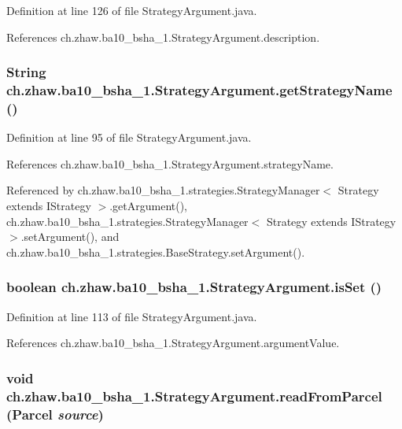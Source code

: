 Definition at line 126 of file StrategyArgument.java.

References ch.zhaw.ba10\_\-bsha\_\-1.StrategyArgument.description.\hypertarget{classch_1_1zhaw_1_1ba10__bsha__1_1_1StrategyArgument_a20a6d523b6d1e1ba34f3d2de700aa6d2}{
\subsubsection[{getStrategyName}]{\setlength{\rightskip}{0pt plus 5cm}String ch.zhaw.ba10\_\-bsha\_\-1.StrategyArgument.getStrategyName ()}}
\label{classch_1_1zhaw_1_1ba10__bsha__1_1_1StrategyArgument_a20a6d523b6d1e1ba34f3d2de700aa6d2}


Definition at line 95 of file StrategyArgument.java.

References ch.zhaw.ba10\_\-bsha\_\-1.StrategyArgument.strategyName.

Referenced by ch.zhaw.ba10\_\-bsha\_\-1.strategies.StrategyManager$<$ Strategy extends IStrategy $>$.getArgument(), ch.zhaw.ba10\_\-bsha\_\-1.strategies.StrategyManager$<$ Strategy extends IStrategy $>$.setArgument(), and ch.zhaw.ba10\_\-bsha\_\-1.strategies.BaseStrategy.setArgument().\hypertarget{classch_1_1zhaw_1_1ba10__bsha__1_1_1StrategyArgument_acb69a3eb712c170e58895e7acc2ebed5}{
\subsubsection[{isSet}]{\setlength{\rightskip}{0pt plus 5cm}boolean ch.zhaw.ba10\_\-bsha\_\-1.StrategyArgument.isSet ()}}
\label{classch_1_1zhaw_1_1ba10__bsha__1_1_1StrategyArgument_acb69a3eb712c170e58895e7acc2ebed5}


Definition at line 113 of file StrategyArgument.java.

References ch.zhaw.ba10\_\-bsha\_\-1.StrategyArgument.argumentValue.\hypertarget{classch_1_1zhaw_1_1ba10__bsha__1_1_1StrategyArgument_a5e5f2a91947c234f3e4eb17e34bdd9cd}{
\subsubsection[{readFromParcel}]{\setlength{\rightskip}{0pt plus 5cm}void ch.zhaw.ba10\_\-bsha\_\-1.StrategyArgument.readFromParcel (Parcel {\em source})}}
\label{classch_1_1zhaw_1_1ba10__bsha__1_1_1StrategyArgument_a5e5f2a91947c234f3e4eb17e34bdd9cd}


